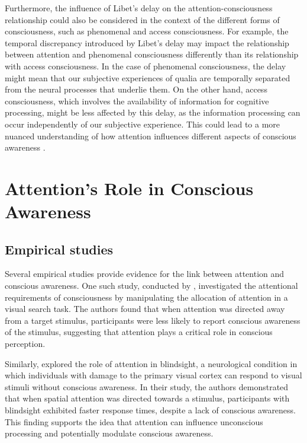 \documentclass[10pt]{article}
\begin{document}
\begin{sloppypar}
  Furthermore, the influence of Libet’s delay on the attention-consciousness relationship could also be considered in the context of the different forms of consciousness, such as phenomenal and access consciousness. For example, the temporal discrepancy introduced by Libet’s delay may impact the relationship between attention and phenomenal consciousness differently than its relationship with access consciousness. In the case of phenomenal consciousness, the delay might mean that our subjective experiences of qualia are temporally separated from the neural processes that underlie them. On the other hand, access consciousness, which involves the availability of information for cognitive processing, might be less affected by this delay, as the information processing can occur independently of our subjective experience. This could lead to a more nuanced understanding of how attention influences different aspects of conscious awareness \citep{dijksterhuis_goals_2010, kozuch_gorillas_2018}.

  \section{Attention's Role in Conscious Awareness}
  \label{sec:evidence}

  \subsection{Empirical studies}
  \label{sec:empirical}

  Several empirical studies provide evidence for the link between attention and conscious awareness. One such study, conducted by \cite{cohen_attentional_2012}, investigated the attentional requirements of consciousness by manipulating the allocation of attention in a visual search task. The authors found that when attention was directed away from a target stimulus, participants were less likely to report conscious awareness of the stimulus, suggesting that attention plays a critical role in conscious perception.

  Similarly, \cite{kentridge_spatial_2004} explored the role of attention in blindsight, a neurological condition in which individuals with damage to the primary visual cortex can respond to visual stimuli without conscious awareness. In their study, the authors demonstrated that when spatial attention was directed towards a stimulus, participants with blindsight exhibited faster response times, despite a lack of conscious awareness. This finding supports the idea that attention can influence unconscious processing and potentially modulate conscious awareness.


\end{sloppypar}
\end{document}
